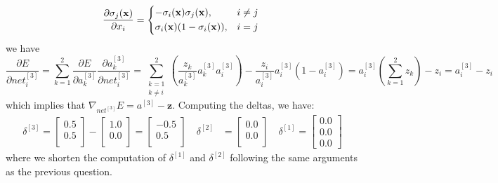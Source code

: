 \documentclass{exam}
\begin{document}
\begin{questions}
\begin{itemize}
\begin{equation*}
                \frac{\partial \sigma_j(\mathbf{x})}{\partial x_i} = 
                    \begin{cases*}
                        -\sigma_i(\mathbf{x}) \sigma_j(\mathbf{x}), & $i \neq j$ \\
                        \sigma_i(\mathbf{x}) ( 1 - \sigma_i(\mathbf{x})), & $i = j$
                    \end{cases*}
                \end{equation*}
                we have
                \begin{equation*}
                    \frac{\partial E}{\partial net_i^{[3]}} = 
                    \sum_{k = 1}^{2} \frac{\partial E}{\partial a_k^{[3]}} \frac{\partial a_k^{[3]}}{\partial net_i^{[3]}} =
                    \sum_{\substack{ k = 1 \\ k \neq i}}^{2} \left(\frac{z_k}{a_k^{[3]}} a_k^{[3]} a_i^{[3]}\right) - \frac{z_i}{a_i^{[3]}} a_i^{[3]} ( 1 - a_i^{[3]})  = a_i^{[3]} \left(\sum_{k = 1}^{2} z_k\right) - z_i = a_i^{[3]} - z_i 
                \end{equation*}
                which implies that $\nabla_{net^{[3]}} E = a^{[3]} - \mathbf{z}$. Computing the deltas, we have:
                \begin{align*}
                    \delta^{[3]} = 
                    \begin{bmatrix}
                        0.5  \\
                        0.5 \\
                    \end{bmatrix} -
                    \begin{bmatrix}
                        1.0  \\
                        0.0  \\
                    \end{bmatrix} = 
                    \begin{bmatrix}
                        -0.5  \\
                        0.5  \\
                    \end{bmatrix} \quad
                    \delta^{[2]} &= 
                    \begin{bmatrix}
                        0.0  \\
                        0.0  \\
                    \end{bmatrix} \quad
                    \delta^{[1]} = 
                    \begin{bmatrix}
                        0.0  \\
                        0.0  \\
                        0.0
                    \end{bmatrix}
                \end{align*} 
                where we shorten the computation of $\delta^{[1]}$ and $\delta^{[2]}$ following the same arguments as the previous question.


\end{itemize}
\end{questions}
\end{document}
